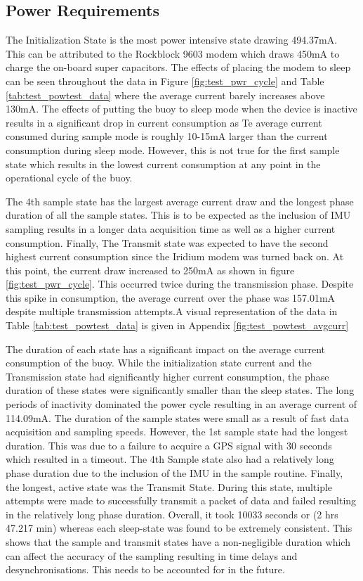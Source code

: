 \subsection{Power Requirements}
\label{subsection:PWR}
The Initialization State is the most power intensive state drawing 494.37mA. This can be attributed to the Rockblock 9603 modem which draws 450mA to charge the on-board super capacitors. The effects of placing the modem to sleep can be seen throughout the data in Figure \ref{fig:test_pwr_cycle} and Table \ref{tab:test_powtest_data} where the average current barely increases above 130mA. The effects of putting the buoy to sleep mode when the device is inactive results in a significant drop in current consumption as Te average current consumed during sample mode is roughly 10-15mA larger than the current consumption during sleep mode. However, this is not true for the first sample state which results in the lowest current consumption at any point in the operational cycle of the buoy.\par The 4th sample state has the largest average current draw and the longest phase duration of all the sample states. This is to be expected as the inclusion of IMU sampling results in a longer data acquisition time as well as a higher current consumption. Finally, The Transmit state was expected to have the second highest current consumption since the Iridium modem was turned back on. At this point, the current draw increased to 250mA as shown in figure \ref{fig:test_pwr_cycle}. This occurred twice during the transmission phase. Despite this spike in consumption, the average current over the phase was 157.01mA despite multiple transmission attempts.A visual representation of the data in Table \ref{tab:test_powtest_data} is given in Appendix \ref{fig:test_powtest_avgcurr}

The duration of each state has a significant impact on the average current consumption of the buoy. While the initialization state current and the Transmission state had significantly higher current consumption, the phase duration of these states were significantly smaller than the sleep states. The long periods of inactivity dominated the power cycle resulting in an average current of 114.09mA. The duration of the sample states were small as a result of fast data acquisition and sampling speeds. However, the 1st sample state had the longest duration. This was due to a failure to acquire a GPS signal with 30 seconds which resulted in a timeout. The 4th Sample state also had a relatively long phase duration due to the inclusion of the IMU in the sample routine. Finally, the longest, active state was the Transmit State. During this state, multiple attempts were made to successfully transmit a packet of data and failed resulting in the relatively long phase duration. Overall, it took 10033 seconds or (2 hrs 47.217 min) whereas each sleep-state was found to be extremely consistent. This shows that the sample and transmit states have a non-negligible duration which can affect the accuracy of the sampling resulting in time delays and desynchronisations. This needs to be accounted for in the future.

